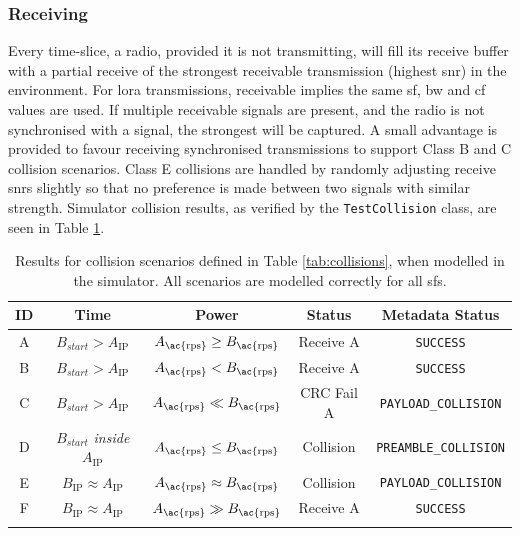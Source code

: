 \subsubsection{Receiving}
Every time-slice, a radio, provided it is not transmitting, will fill its receive buffer with a partial receive of the strongest receivable transmission (highest \ac{snr}) in the environment. For \ac{lora} transmissions, receivable implies the same \ac{sf}, \ac{bw} and \ac{cf} values are used. If multiple receivable signals are present, and the radio is not synchronised with a signal, the strongest will be captured. A small advantage is provided to favour receiving synchronised transmissions to support Class B and C collision scenarios. Class E collisions are handled by randomly adjusting receive \ac{snr}s slightly so that no preference is made between two signals with similar strength. Simulator collision results, as verified by the \texttt{TestCollision} class, are seen in Table  \ref{tab:sim_collisions}.

\begin{table}[H]
\centering\small
\caption[Simulator results for collision scenarios]{Results for collision scenarios defined in Table \ref{tab:collisions}, when modelled in the simulator. All scenarios are modelled correctly for all \ac{sf}s.}
\begin{tabular}{c|cc|c|c}
    \toprule
    \textbf{ID} & \textbf{Time} & \textbf{Power} & \textbf{Status} & \textbf{Metadata Status}\\
    \midrule\addlinespace
    A & $B_{start} > A_{\text{IP}}$ & $A_{\text{\ac{rps}}} \geq B_{\text{\ac{rps}}}$ & Receive A &  \cellcolor{green!25}\texttt{SUCCESS} \\
    B & $B_{start} > A_{\text{IP}}$ & $A_{\text{\ac{rps}}} < B_{\text{\ac{rps}}}$ & Receive A &  \cellcolor{green!25}\texttt{SUCCESS} \\
    C & $B_{start} > A_{\text{IP}}$ & $A_{\text{\ac{rps}}} \ll B_{\text{\ac{rps}}}$& CRC Fail A &  \cellcolor{green!25}\texttt{PAYLOAD\_COLLISION}  \\
    D & $B_{start}$ \textit{inside} $A_{\text{IP}}$ & $A_{\text{\ac{rps}}} \leq B_{\text{\ac{rps}}}$ & Collision &  \cellcolor{green!25}\texttt{PREAMBLE\_COLLISION} \\
    E & $B_{\text{IP}} \approx A_{\text{IP}}$ & $A_{\text{\ac{rps}}} \approx B_{\text{\ac{rps}}}$ & Collision &  \cellcolor{green!25}\texttt{PAYLOAD\_COLLISION}  \\
    F & $B_{\text{IP}} \approx A_{\text{IP}}$ & $A_{\text{\ac{rps}}} \gg B_{\text{\ac{rps}}}$ & Receive A &  \cellcolor{green!25}\texttt{SUCCESS} \\
    \addlinespace\bottomrule
\end{tabular}
\label{tab:sim_collisions}
\end{table}

